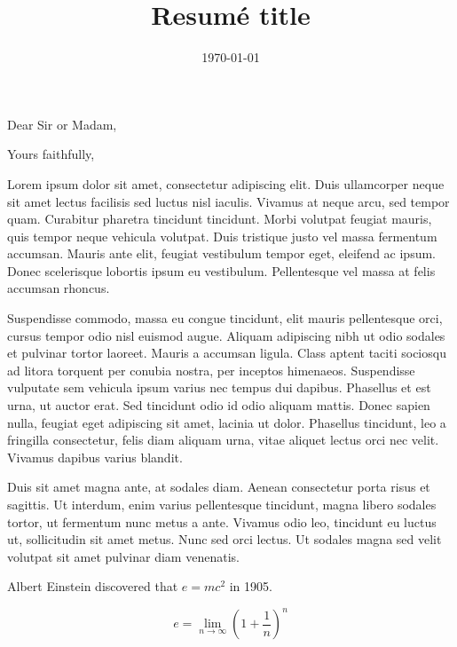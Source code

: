 \documentclass[11pt,a4paper,sans]{mymoderncv}
\title{Resum\'e title}%
\begin{document}

\date{\today}
\opening{Dear Sir or Madam,}
\closing{Yours faithfully,}
{}%
\makelettertitle

Lorem ipsum dolor sit amet, consectetur adipiscing elit. Duis ullamcorper neque sit amet lectus facilisis sed luctus nisl iaculis. Vivamus at neque arcu, sed tempor quam. Curabitur pharetra tincidunt tincidunt. Morbi volutpat feugiat mauris, quis tempor neque vehicula volutpat. Duis tristique justo vel massa fermentum accumsan. Mauris ante elit, feugiat vestibulum tempor eget, eleifend ac ipsum. Donec scelerisque lobortis ipsum eu vestibulum. Pellentesque vel massa at felis accumsan rhoncus.

Suspendisse commodo, massa eu congue tincidunt, elit mauris pellentesque orci, cursus tempor odio nisl euismod augue. Aliquam adipiscing nibh ut odio sodales et pulvinar tortor laoreet. Mauris a accumsan ligula. Class aptent taciti sociosqu ad litora torquent per conubia nostra, per inceptos himenaeos. Suspendisse vulputate sem vehicula ipsum varius nec tempus dui dapibus. Phasellus et est urna, ut auctor erat. Sed tincidunt odio id odio aliquam mattis. Donec sapien nulla, feugiat eget adipiscing sit amet, lacinia ut dolor. Phasellus tincidunt, leo a fringilla consectetur, felis diam aliquam urna, vitae aliquet lectus orci nec velit. Vivamus dapibus varius blandit.

Duis sit amet magna ante, at sodales diam. Aenean consectetur porta risus et sagittis. Ut interdum, enim varius pellentesque tincidunt, magna libero sodales tortor, ut fermentum nunc metus a ante. Vivamus odio leo, tincidunt eu luctus ut, sollicitudin sit amet metus. Nunc sed orci lectus. Ut sodales magna sed velit volutpat sit amet pulvinar diam venenatis.

Albert Einstein discovered that $e=mc^2$ in 1905.

\[ e=\lim_{n \to \infty} \left(1+\frac{1}{n}\right)^n \]

\makeletterclosing

\end{document}
